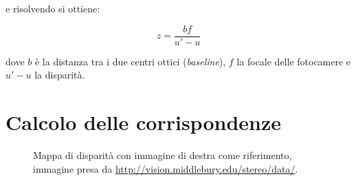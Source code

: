 \documentclass[12pt]{report}
\begin{document}
			\noindent e risolvendo si ottiene:

			\begin{equation}
				z=\frac{bf}{u'-u}
				\label{eq:soluzione}
			\end{equation}
			
			\noindent dove $b$ è la distanza tra i due centri ottici (\textit{baseline}), $f$ la focale delle fotocamere e $u'-u$ la disparità.
		
		
		\section{Calcolo delle corrispondenze}
		\label{sec:corrispondenze}
		
			\begin{figure}
				 \quad
				 \quad
				
				\caption{Mappa di disparità con immagine di destra come riferimento, immagine presa da \url{http://vision.middlebury.edu/stereo/data/}.}
				\label{fig:disparità}
			\end{figure}
			
\end{document}
